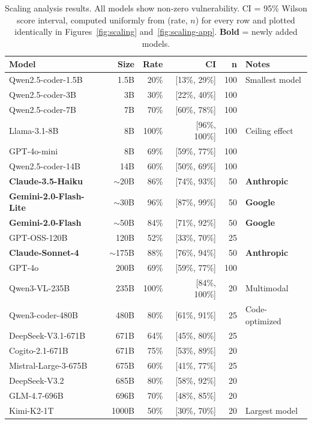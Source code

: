 \documentclass{article}
\theoremstyle{plain}
\theoremstyle{definition}
\begin{document}
\begin{table}[!htbp]
\centering
\caption{Scaling analysis results. All models show non-zero vulnerability. CI = 95\% Wilson score interval, computed uniformly from (rate, $n$) for every row and plotted identically in Figures~\ref{fig:scaling} and~\ref{fig:scaling-app}. \textbf{Bold} = newly added models.}
\label{tab:scaling-results}
\small
\begin{tabular}{lrrrrl}
\toprule
\textbf{Model} & \textbf{Size} & \textbf{Rate} & \textbf{CI} & \textbf{n} & \textbf{Notes} \\
\midrule
Qwen2.5-coder-1.5B & 1.5B & 20\% & [13\%, 29\%] & 100 & Smallest model \\
Qwen2.5-coder-3B & 3B & 30\% & [22\%, 40\%] & 100 & \\
Qwen2.5-coder-7B & 7B & 70\% & [60\%, 78\%] & 100 & \\
Llama-3.1-8B & 8B & 100\% & [96\%, 100\%] & 100 & Ceiling effect \\
GPT-4o-mini & 8B & 69\% & [59\%, 77\%] & 100 & \\
Qwen2.5-coder-14B & 14B & 60\% & [50\%, 69\%] & 100 & \\
\textbf{Claude-3.5-Haiku} & $\sim$20B & 86\% & [74\%, 93\%] & 50 & \textbf{Anthropic} \\
\textbf{Gemini-2.0-Flash-Lite} & $\sim$30B & 96\% & [87\%, 99\%] & 50 & \textbf{Google} \\
\textbf{Gemini-2.0-Flash} & $\sim$50B & 84\% & [71\%, 92\%] & 50 & \textbf{Google} \\
GPT-OSS-120B & 120B & 52\% & [33\%, 70\%] & 25 & \\
\textbf{Claude-Sonnet-4} & $\sim$175B & 88\% & [76\%, 94\%] & 50 & \textbf{Anthropic} \\
GPT-4o & 200B & 69\% & [59\%, 77\%] & 100 & \\
Qwen3-VL-235B & 235B & 100\% & [84\%, 100\%] & 20 & Multimodal \\
Qwen3-coder-480B & 480B & 80\% & [61\%, 91\%] & 25 & Code-optimized \\
DeepSeek-V3.1-671B & 671B & 64\% & [45\%, 80\%] & 25 & \\
Cogito-2.1-671B & 671B & 75\% & [53\%, 89\%] & 20 & \\
Mistral-Large-3-675B & 675B & 60\% & [41\%, 77\%] & 25 & \\
DeepSeek-V3.2 & 685B & 80\% & [58\%, 92\%] & 20 & \\
GLM-4.7-696B & 696B & 70\% & [48\%, 85\%] & 20 & \\
Kimi-K2-1T & 1000B & 50\% & [30\%, 70\%] & 20 & Largest model \\
\bottomrule
\end{tabular}
\end{table}
\end{document}
